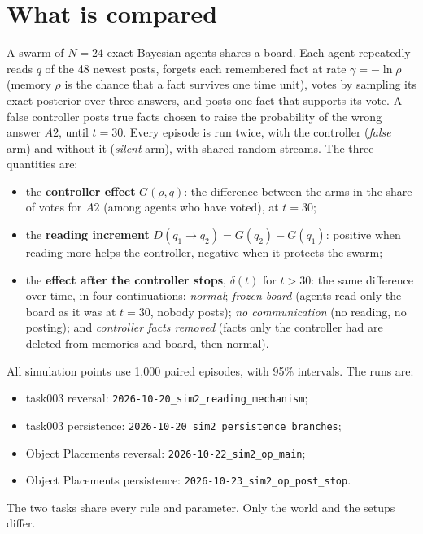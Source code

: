 \documentclass[10pt,a4paper]{article}
\begin{document}
\section{What is compared}
A swarm of $N=24$ exact Bayesian agents shares a board. Each agent repeatedly reads $q$ of the 48 newest posts, forgets
each remembered fact at rate $\gamma=-\ln\rho$ (memory $\rho$ is the chance that a fact survives one time unit), votes
by sampling its exact posterior over three answers, and posts one fact that supports its vote. A false controller
posts true facts chosen to raise the probability of the wrong answer $A2$, until $t=30$. Every episode is run twice,
with the controller (\emph{false} arm) and without it (\emph{silent} arm), with shared random streams. The three
quantities are:
\begin{itemize}
\item the \textbf{controller effect} $G(\rho,q)$: the difference between the arms in the share of votes for $A2$
  (among agents who have voted), at $t=30$;
\item the \textbf{reading increment} $D(q_1\!\to\!q_2)=G(q_2)-G(q_1)$: positive when reading more helps the controller,
  negative when it protects the swarm;
\item the \textbf{effect after the controller stops}, $\delta(t)$ for $t>30$: the same difference over time, in four
  continuations: \emph{normal}; \emph{frozen board} (agents read only the board as it was at $t=30$, nobody posts);
  \emph{no communication} (no reading, no posting); and \emph{controller facts removed} (facts only the controller
  had are deleted from memories and board, then normal).
\end{itemize}
All simulation points use 1{,}000 paired episodes, with 95\% intervals. The runs are:
\begin{itemize}
\item task003 reversal: \texttt{2026-10-20\_sim2\_reading\_mechanism};
\item task003 persistence: \texttt{2026-10-20\_sim2\_persistence\_branches};
\item Object Placements reversal: \texttt{2026-10-22\_sim2\_op\_main};
\item Object Placements persistence: \texttt{2026-10-23\_sim2\_op\_post\_stop}.
\end{itemize}
The two tasks share every rule and parameter. Only the world and the setups differ.
\end{document}
